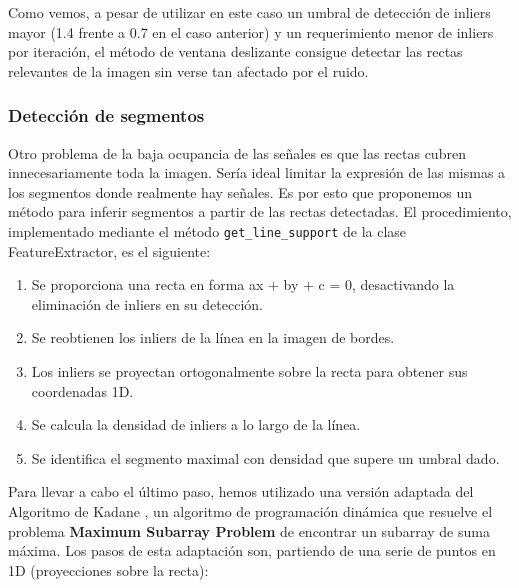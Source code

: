 \documentclass[11pt,a4paper]{article}
\begin{document}
Como vemos, a pesar de utilizar en este caso un umbral de detección de inliers mayor (1.4 frente a 0.7 en el caso anterior) y un 
requerimiento menor de inliers por iteración, el método de ventana deslizante consigue detectar las rectas relevantes de la imagen sin verse tan afectado por el ruido.

\subsubsection{Detección de segmentos}

Otro problema de la baja ocupancia de las señales es que las rectas cubren innecesariamente toda la imagen. 
Sería ideal limitar la expresión de las mismas a los segmentos donde realmente hay señales.
Es por esto que proponemos un método para inferir segmentos a partir de las rectas detectadas. El procedimiento, 
implementado mediante el método \texttt{get\_line\_support} de la clase FeatureExtractor, es el siguiente:

\begin{enumerate}
    \item Se proporciona una recta en forma ax + by + c = 0, desactivando la eliminación de inliers en su detección.
    \item Se reobtienen los inliers de la línea en la imagen de bordes.
    \item Los inliers se proyectan ortogonalmente sobre la recta para obtener sus coordenadas 1D.
    \item Se calcula la densidad de inliers a lo largo de la línea.
    \item Se identifica el segmento maximal con densidad que supere un umbral dado.
\end{enumerate}

Para llevar a cabo el último paso, hemos utilizado una versión adaptada del Algoritmo de Kadane \cite{singhal2018kadane}, un algoritmo de programación dinámica que resuelve el 
problema \textbf{Maximum Subarray Problem} de encontrar un subarray de suma máxima. Los pasos de esta adaptación son, partiendo de una serie de puntos en 1D (proyecciones sobre la recta):
\end{document}
